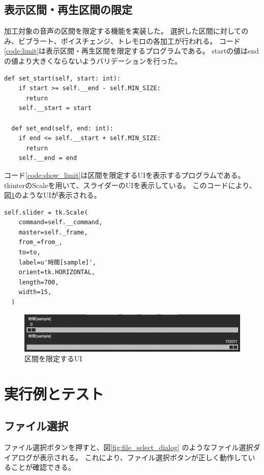 \documentclass[a4paper,11pt]{jsarticle}
\begin{document}
\subsection{表示区間・再生区間の限定}

加工対象の音声の区間を限定する機能を実装した。
選択した区間に対してのみ、ビブラート、ボイスチェンジ、トレモロの各加工が行われる。
コード\ref{code:limit}は表示区間・再生区間を限定するプログラムである。
startの値はendの値より大きくならないようバリデーションを行った。

\begin{lstlisting}[caption=表示区間・再生区間の限定,label=code:limit]
  def set_start(self, start: int):
    if start >= self.__end - self.MIN_SIZE:
      return
    self.__start = start

  def set_end(self, end: int):
    if end <= self.__start + self.MIN_SIZE:
      return
    self.__end = end
\end{lstlisting}

コード\ref{code:show_limit}は区間を限定するUIを表示するプログラムである。
tkinterのScaleを用いて、スライダーのUIを表示している。
このコードにより、図\ref{fig:sliders}のようなUIが表示される。

\begin{lstlisting}[caption=区間を限定するUI,label=code:show_limit]
  self.slider = tk.Scale(
    command=self.__command,
    master=self._frame,
    from_=from_,
    to=to,
    label=u'時間[sample]',
    orient=tk.HORIZONTAL,
    length=700,
    width=15,
  )
\end{lstlisting}

\begin{figure}[h]
\centering
\includegraphics[keepaspectratio, width = 13cm]
{./images/sliders.png}
\caption{区間を限定するUI}
\label{fig:sliders}
\end{figure}

\section{実行例とテスト}
\subsection{ファイル選択}
ファイル選択ボタンを押すと、図\ref{fig:file_select_dialog}
のようなファイル選択ダイアログが表示される。
これにより、ファイル選択ボタンが正しく動作していることが確認できる。
\end{document}
